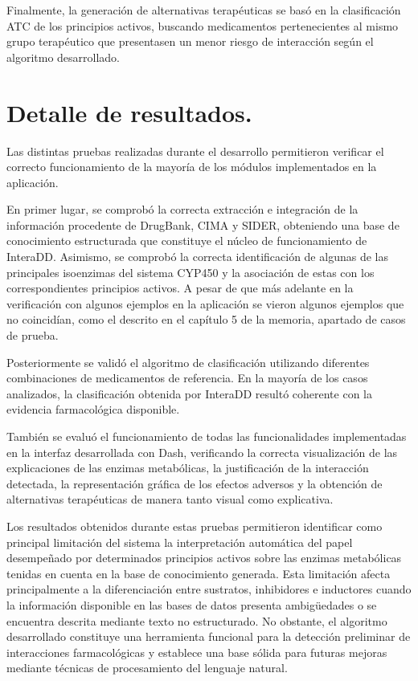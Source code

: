 Finalmente, la generación de alternativas terapéuticas se basó en la clasificación ATC de los principios activos, buscando medicamentos pertenecientes al mismo grupo terapéutico que presentasen un menor riesgo de interacción según el algoritmo desarrollado.

\section{Detalle de resultados.}

Las distintas pruebas realizadas durante el desarrollo permitieron verificar el correcto funcionamiento de la mayoría de los módulos implementados en la aplicación.

En primer lugar, se comprobó la correcta extracción e integración de la información procedente de DrugBank, CIMA y SIDER, obteniendo una base de conocimiento estructurada que constituye el núcleo de funcionamiento de InteraDD. Asimismo, se comprobó la correcta identificación de algunas de las principales isoenzimas del sistema CYP450 y la asociación de estas con los correspondientes principios activos. A pesar de que más adelante en la verificación con algunos ejemplos en la aplicación se vieron algunos ejemplos que no coincidían, como el descrito en el capítulo 5 de la memoria, apartado de casos de prueba.

Posteriormente se validó el algoritmo de clasificación utilizando diferentes combinaciones de medicamentos de referencia. En la mayoría de los casos analizados, la clasificación obtenida por InteraDD resultó coherente con la evidencia farmacológica disponible.

También se evaluó el funcionamiento de todas las funcionalidades implementadas en la interfaz desarrollada con Dash, verificando la correcta visualización de las explicaciones de las enzimas metabólicas, la justificación de la interacción detectada, la representación gráfica de los efectos adversos y la obtención de alternativas terapéuticas de manera tanto visual como explicativa.

Los resultados obtenidos durante estas pruebas permitieron identificar como principal limitación del sistema la interpretación automática del papel desempeñado por determinados principios activos sobre las enzimas metabólicas tenidas en cuenta en la base de conocimiento generada. Esta limitación afecta principalmente a la diferenciación entre sustratos, inhibidores e inductores cuando la información disponible en las bases de datos presenta ambigüedades o se encuentra descrita mediante texto no estructurado. No obstante, el algoritmo desarrollado constituye una herramienta funcional para la detección preliminar de interacciones farmacológicas y establece una base sólida para futuras mejoras mediante técnicas de procesamiento del lenguaje natural.
